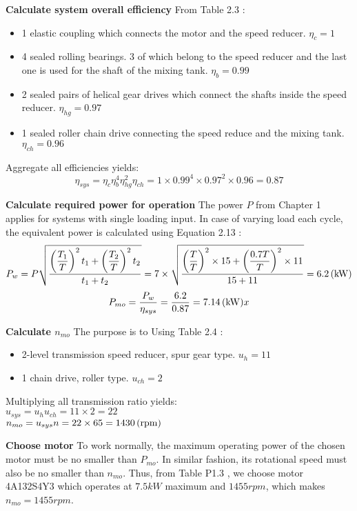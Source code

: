 \textbf{Calculate system overall efficiency} From Table 2.3 \cite{tk1}:
\begin{itemize}
	\item 1 elastic coupling which connects the motor and the speed reducer. $ \eta_c = 1 $
	\item 4 sealed rolling bearings. 3 of which belong to the speed reducer and the last one is used for the shaft of the mixing tank. $ \eta_b = 0.99 $
	\item 2 sealed pairs of helical gear drives which connect the shafts inside the speed reducer. $ \eta_{hg} = 0.97 $
	\item 1 sealed roller chain drive connecting the speed reduce and the mixing tank. $ \eta_{ch} = 0.96 $
\end{itemize}
Aggregate all efficiencies yields: 
\[\eta_{sys} = \eta_c\eta_b^4\eta_{hg}^2\eta_{ch} = 1 \times 0.99^4 \times 0.97^2 \times 0.96 = 0.87\]

\textbf{Calculate required power for operation}
The power $ P $ from Chapter 1 applies for systems with single loading input. In case of varying load each cycle, the equivalent power is calculated using  Equation 2.13 \cite{tk1}:
\[P_w = P\sqrt{\dfrac{\left(\dfrac{T_1}{T}\right)^2t_1 + \left(\dfrac{T_2}{T}\right)^2t_2}{t_1+t_2}} = 7 \times \sqrt{\dfrac{\left(\dfrac{T}{T}\right)^2\times15 + \left(\dfrac{0.7T}{T}\right)^2\times11}{15+11}} = 6.2 \, (\mathrm{kW})\]
\[P_{mo} = \dfrac{P_w}{\eta_{sys}} = \dfrac{6.2}{0.87} = 7.14 \, (\mathrm{kW})x\]

\textbf{Calculate $ n_{mo} $} The purpose is to Using Table 2.4 \cite{tk1}:
\begin{itemize}
	\item 2-level transmission speed reducer, spur gear type. $ u_{h} = 11 $
	\item 1 chain drive, roller type. $ u_{ch} = 2$
\end{itemize}
Multiplying all transmission ratio yields:\\
$ u_{sys} = u_{h}u_{ch} = 11 \times 2 = 22 $\\
$ n_{mo} = u_{sys}n = 22 \times 65 = 1430 \, (\mathrm{rpm}) $

\textbf{Choose motor}
To work normally, the maximum operating power of the chosen motor must be no smaller than $ P_{mo} $. In similar fashion, its rotational speed must also be no smaller than  $ n_{mo} $. Thus, from Table P1.3 \cite{tk1}, we choose motor 4A132S4Y3 which operates at $ 7.5 \unit{kW} $ maximum and $ 1455 \unit{rpm} $, which makes $ n_{mo} = 1455\unit{rpm}$.

